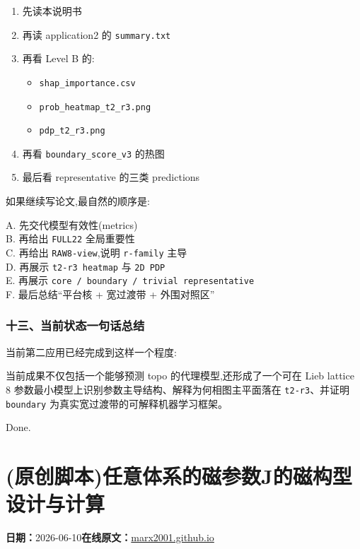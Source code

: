 \documentclass[lang=cn,scheme=chinese,color=blue,device=normal,toc=onecol,math=cm]{elegantbook}
\begin{document}
\begin{enumerate}
\item 先读本说明书
\item 再读 application2 的 \texttt{summary.txt}
\item 再看 Level B 的: 
\begin{itemize}
\item \texttt{shap\_\allowbreak{}importance.csv}
\item \texttt{prob\_\allowbreak{}heatmap\_\allowbreak{}t2\_\allowbreak{}r3.png}
\item \texttt{pdp\_\allowbreak{}t2\_\allowbreak{}r3.png}
\end{itemize}
\item 再看 \texttt{boundary\_\allowbreak{}score\_\allowbreak{}v3} 的热图
\item 最后看 representative 的三类 predictions
\end{enumerate}


如果继续写论文,最自然的顺序是:\par


A. 先交代模型有效性(metrics)\\ B. 再给出 \texttt{FULL22} 全局重要性\\ C. 再给出 \texttt{RAW8-view},说明 \texttt{r-family} 主导\\ D. 再展示 \texttt{t2-r3 heatmap} 与 \texttt{2D PDP}\\ E. 再展示 \texttt{core /\allowbreak{} boundary /\allowbreak{} trivial representative}\\ F. 最后总结“平台核 + 宽过渡带 + 外围对照区”\par


\subsubsection{十三、当前状态一句话总结}


当前第二应用已经完成到这样一个程度:\par


当前成果不仅包括一个能够预测 topo 的代理模型,还形成了一个可在 Lieb lattice 8 参数最小模型上识别参数主导结构、解释为何相图主平面落在 \texttt{t2-r3}、并证明 \texttt{boundary} 为真实宽过渡带的可解释机器学习框架。\par


Done.\par



\section{(原创脚本)任意体系的磁参数J的磁构型设计与计算}
\begin{articlemeta}
\textbf{日期：}2026-06-10\hfill\textbf{在线原文：}\href{https://marx2001.github.io/sci-note\_posts/20260610}{marx2001.github.io}
\end{articlemeta}
\end{document}
